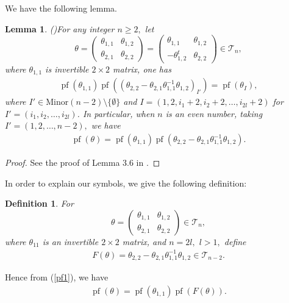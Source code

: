 \documentclass[9pt, BCOR=2mm]{amsart}
\numberwithin{equation}{section}
\numberwithin{equation}{section}
\newtheorem{lemma}[theorem]{Lemma}
\newtheorem{definition}[theorem]{Definition}
\newcommand{\pf}{{\operatorname{pf}}}
\newcommand{\m}[2]{\ensuremath{{#1}_{#2}}}
\begin{document}
We have the following lemma.
\begin{lemma}(\cite[Lemma 3.6]{CH21})\label{submatrix,x}
For any integer $n\geq 2,$
let
  $$\theta=\left(\begin{matrix}
                  \theta_{1,1} &  \theta_{1,2} \\
                 \theta_{2,1}& \theta_{2,2}
                 \end{matrix}
\right)=\left(\begin{matrix}
                  \theta_{1,1} &  \theta_{1,2} \\
                 -\theta_{1,2}^t& \theta_{2,2}
                 \end{matrix}
\right)\in \mathcal{T}_n,$$
where $\theta_{1,1}$ is invertible $2\times 2$ matrix, one has
\begin{eqnarray}\label{=2}
{\pf}(\theta_{1,1}){\pf}(\m{(\theta_{2,2}-\theta_{2,1}\theta_{1,1}^{-1}\theta_{1,2})}{I'})
={\pf}(\m{\theta}{I}),
\end{eqnarray}
where $I'\in \mathrm{Minor}(n-2)\setminus \{\emptyset\}$ and $I=(1,2,i_1+2,i_2+2,\dots,i_{2l}+2)$ for $I'=(i_1,i_2,\dots,i_{2l})$.
In particular, when $n$ is an even number, taking $I'=(1,2,\dots,n-2),$  we have
\begin{eqnarray}\label{pf1}
  {\pf}(\theta)%
  ={\pf}(\theta_{1,1}){\pf}(\theta_{2,2}-\theta_{2,1}\theta_{1,1}^{-1}\theta_{1,2}).
\end{eqnarray}
\end{lemma}
\begin{proof}
See the proof of Lemma 3.6 in \cite{CH21}.
\end{proof}

In order to explain our symbols, we give the following definition:
\begin{definition}
  For $$\theta=\left(\begin{matrix}
                 \theta_{1,1} &  \theta_{1,2} \\
               \theta_{2,1}& \theta_{2,2}
                 \end{matrix}\right)\in\mathcal{T}_n,$$
                 where $\theta_{11}$ is an invertible $2\times2$ matrix,
                 and $n=2l,$ $l>1,$ define
                 \begin{eqnarray}\label{de F}
                 F(\theta)=%
                 \theta_{2,2}-\theta_{2,1}\theta_{1,1}^{-1}\theta_{1,2}\in \mathcal{T}_{n-2}.
                 \end{eqnarray}
\end{definition}
Hence from (\ref{pf1}), we have
\begin{eqnarray}\label{q1}
{\pf}(\theta)={\pf}(\theta_{1,1}){\pf}(F(\theta)).
\end{eqnarray}
\end{document}
